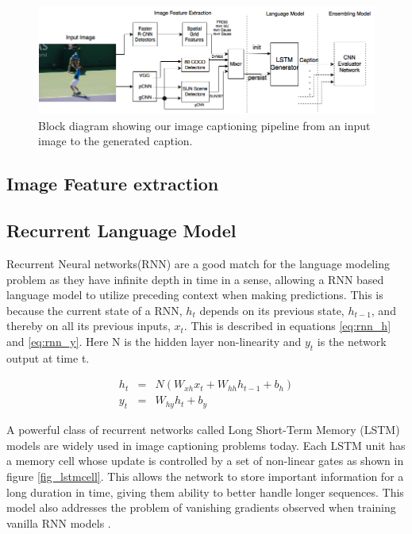 \begin{figure}[t]
  \begin{center}
      \hspace{-10mm}\includegraphics[width=1.2\linewidth]{images/AcMM_fullModel.png}
  \end{center}
  \vspace*{-3mm}
  \caption{Block diagram showing our image captioning pipeline from an
  input image to the generated caption.}
  \label{fig_fullModel}
\end{figure}


\subsection{Image Feature extraction}


\subsection{Recurrent Language Model}
Recurrent Neural networks(RNN) are a good match for the language modeling
problem as they have infinite depth in time in a sense, allowing a RNN based
language model to utilize preceding context when making predictions. This is
because the current state of a RNN, $h_t$ depends on its previous state,
$h_{t-1}$, and thereby on all its previous inputs, $x_t$. This is described in
equations \ref{eq:rnn_h} and \ref{eq:rnn_y}. Here N is the hidden layer
non-linearity and $y_t$ is the network output at time t.

\begin{eqnarray}
    \label{eq:rnn_h} h_t &=& N(W_{xh}x_t+W_{hh}h_{t-1}+b_h)\\
    \label{eq:rnn_y} y_t &=& W_{hy}h_t + b_y
\end{eqnarray} 

A powerful class of recurrent networks called Long Short-Term Memory
(LSTM) models \cite{Hochreiter:1997:LSM:1246443.1246450} are widely used in
image captioning problems today.
Each LSTM unit has a memory cell whose update is controlled by a set of
non-linear gates as shown in figure \ref{fig_lstmcell}. This allows the network
to store important information for a long duration in time, giving them ability
to better handle longer sequences. This model also addresses the problem of
vanishing gradients observed when training vanilla RNN models
\cite{Bengio93Vanishing}\cite{pascanu2012difficulty}.

